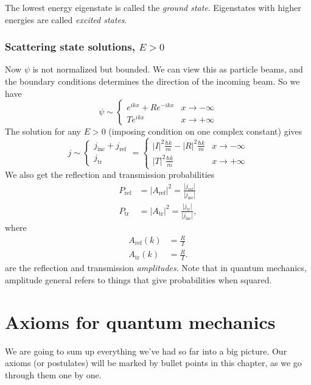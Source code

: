 \documentclass[a4paper]{article}
\begin{document}
\begin{defi}
  The lowest energy eigenstate is called the \emph{ground state}. Eigenstates with higher energies are called \emph{excited states}.
\end{defi}

\subsubsection*{Scattering state solutions, \texorpdfstring{$E > 0$}{E }}
Now $\psi$ is not normalized but bounded. We can view this as particle beams, and the boundary conditions determines the direction of the incoming beam. So we have
\[
  \psi \sim
  \begin{cases}
    e^{ikx} + R e^{-ikx} & x \to -\infty\\
    Te^{ikx} & x \to +\infty
  \end{cases}
\]
The solution for any $E > 0$ (imposing condition on one complex constant) gives
\[
  j \sim
  \begin{cases}
    j_{\mathrm{inc}} + j_{\mathrm{ref}}\\
    j_{\mathrm{tr}}
  \end{cases}
  =
  \begin{cases}
    |I|^2 \frac{\hbar k}{m} - |R|^2 \frac{\hbar k}{m} & x \to -\infty\\
    |T|^2 \frac{\hbar k}{m} & x \to +\infty
  \end{cases}
\]
We also get the reflection and transmission probabilities
\begin{align*}
  P_{\mathrm{ref}} &= |A_{\mathrm{ref}}|^2 = \frac{|j_{\mathrm{ref}}|}{|j_{\mathrm{inc}}|}\\
  P_{\mathrm{tr}} &= |A_{\mathrm{tr}}|^2 = \frac{|j_{\mathrm{tr}}|}{|j_{\mathrm{inc}}|},
\end{align*}
where
\begin{align*}
  A_{\mathrm{ref}}(k) &= \frac{R}{I} \\
  A_{\mathrm{tr}}(k) &= \frac{R}{I}.
\end{align*}
are the reflection and transmission \emph{amplitudes}. Note that in quantum mechanics, amplitude general refers to things that give probabilities when squared.

\section{Axioms for quantum mechanics}
We are going to sum up everything we've had so far into a big picture. Our axioms (or postulates) will be marked by bullet points in this chapter, as we go through them one by one.
\end{document}
